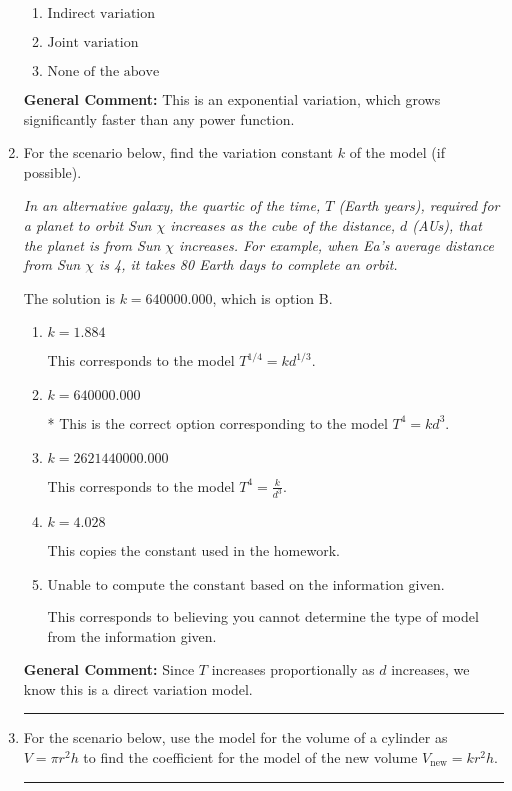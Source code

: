 \documentclass{extbook}[14pt]
\newcommand{\litem}[1]{\item #1

\rule{\textwidth}{0.4pt}}
\begin{document}
\begin{enumerate}
{\begin{enumerate}[label=\Alph*.]
\item \( \text{Indirect variation} \)


\item \( \text{Joint variation} \)


\item \( \text{None of the above} \)


\end{enumerate}

\textbf{General Comment:} This is an exponential variation, which grows significantly faster than any power function.
}
\litem{
For the scenario below, find the variation constant $k$ of the model (if possible).

\begin{center}
    \textit{ In an alternative galaxy, the quartic of the time, $T$ (Earth years), required for a planet to orbit Sun $\chi$ increases as the cube of the distance, $d$ (AUs), that the planet is from Sun $\chi$ increases. For example, when Ea's average distance from Sun $\chi$ is 4, it takes 80 Earth days to complete an orbit. }
\end{center}
The solution is \( k = 640000.000 \), which is option B.\begin{enumerate}[label=\Alph*.]
\item \( k = 1.884 \)

This corresponds to the model $T^{1/4} = k d^{1/3}$.
\item \( k = 640000.000 \)

* This is the correct option corresponding to the model $T^{4} = k d^{3}$.
\item \( k = 2621440000.000 \)

This corresponds to the model $T^{4} = \frac{k}{d^{3}}$.
\item \( k = 4.028 \)

This copies the constant used in the homework.
\item \( \text{Unable to compute the constant based on the information given.} \)

This corresponds to believing you cannot determine the type of model from the information given.
\end{enumerate}

\textbf{General Comment:} Since $T$ increases proportionally as $d$ increases, we know this is a direct variation model.
}
\litem{
For the scenario below, use the model for the volume of a cylinder as $V = \pi r^2 h$ to find the coefficient for the model of the new volume $V_{\text{new}} = k r^2 h$.

}
\end{enumerate}
\end{document}
